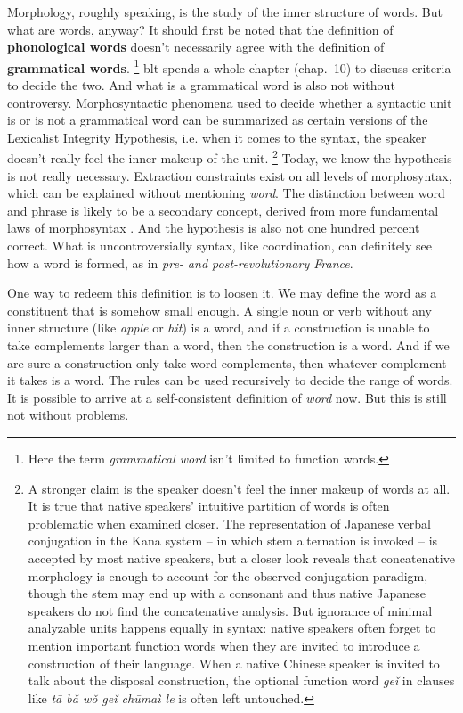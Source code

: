 \documentclass[UTF8, a4paper, oneside, scheme=plain]{ctexart}
\newcommand*{\citechap}[1]{chap.~{#1}}
\newcommand*{\concept}[1]{\textbf{#1}}
\newcommand*{\term}[1]{\emph{#1}}
\newcommand*{\corpus}[1]{\emph{#1}}
\begin{document}
Morphology, roughly speaking, 
is the study of the inner structure of words.
But what are words, anyway?
It should first be noted that the definition of \concept{phonological words} 
doesn't necessarily agree with the definition of \concept{grammatical words}.%
\footnote{
    Here the term \term{grammatical word} isn't limited to function words.
}
\ac{blt} spends a whole chapter (\citechap{10}) to discuss 
criteria to decide the two.
And what is a grammatical word is also not without controversy.
Morphosyntactic phenomena used to decide 
whether a syntactic unit is or is not a grammatical word 
can be summarized as certain versions of the Lexicalist Integrity Hypothesis,
i.e. when it comes to the syntax,
the speaker doesn't really feel the inner makeup of the unit.%
\footnote{
    A stronger claim is the speaker doesn't feel the inner makeup of words at all.
    It is true that native speakers' intuitive partition of words 
    is often problematic when examined closer.
    The representation of Japanese verbal conjugation in the Kana system
    -- in which stem alternation is invoked --
    is accepted by most native speakers,
    but a closer look reveals that concatenative morphology 
    is enough to account for the observed conjugation paradigm,
    though the stem may end up with a consonant and  
    thus native Japanese speakers do not find the concatenative analysis.
    But ignorance of minimal analyzable units happens equally in syntax: 
    native speakers often forget to mention important function words 
    when they are invited to introduce a construction of their language.
    When a native Chinese speaker is invited to talk about the disposal construction,
    the optional function word \corpus{geǐ} in clauses like 
    \corpus{t\={a} b\v{a} w\v{o} geǐ ch\={u}ma\`{i} le} %
    is often left untouched. %
}
Today, we know the hypothesis is not really necessary.
Extraction constraints exist on all levels of morphosyntax,
which can be explained without mentioning \term{word}.
The distinction between word and phrase is likely to be 
a secondary concept,
derived from more fundamental laws of morphosyntax
\citep{bruening2018lexicalist}.
And the hypothesis is also not one hundred percent correct.
What is uncontroversially syntax, like coordination, 
can definitely see how a word is formed,
as in \corpus{pre- and post-revolutionary France}.

One way to redeem this definition is to loosen it.
We may define the word as a constituent that is somehow small enough.
A single noun or verb without any inner structure (like \corpus{apple} or \corpus{hit}) is a word,
and if a construction is unable to take complements larger than a word,
then the construction is a word.
And if we are sure a construction only take word complements,
then whatever complement it takes is a word.
The rules can be used recursively to decide the range of words.
It is possible to arrive at a self-consistent definition of \term{word} now.
But this is still not without problems.
\end{document}
